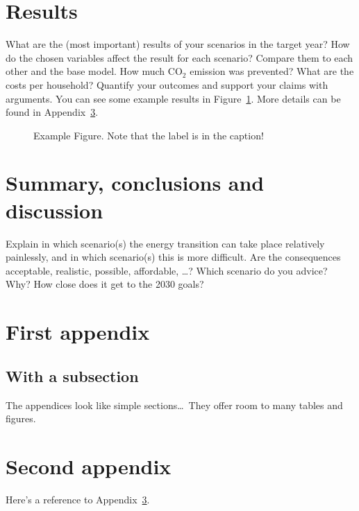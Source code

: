 \documentclass[11pt]{article}
\begin{document}
\section{Results}
\label{sec:results}

What are the (most important) results of your scenarios in the target year?
How do the chosen variables affect the result for each scenario?  Compare them to each other and the
base model. How much CO$_2$ emission was prevented? What are the costs per household?  Quantify your
outcomes and support your claims with arguments.  You can see some example results in Figure~\ref{fig:SRES}.
More details can be found in Appendix~\ref{app:firstApp}.

\begin{figure}
  \centering
  \caption{Example Figure.  Note that the label is in the caption!
    \label{fig:SRES}
  }
\end{figure}


\section{Summary, conclusions and discussion}
\label{sec:conclusions}

Explain in which scenario(s) the energy transition can take place relatively painlessly, and in which
scenario(s) this is more difficult. Are the consequences acceptable, realistic, possible, affordable, \ldots?
Which scenario do you advice? Why?  How close does it get to the 2030 goals?


\begin{appendices}  %
  \section{First appendix}
  \label{app:firstApp}
  
  \subsection*{With a subsection}
  
  The appendices look like simple sections\ldots\
  They offer room to many tables and figures.
  
  
  \section{Second appendix}
  Here's a reference to Appendix~\ref{app:firstApp}.
  
\end{appendices}
\end{document}
